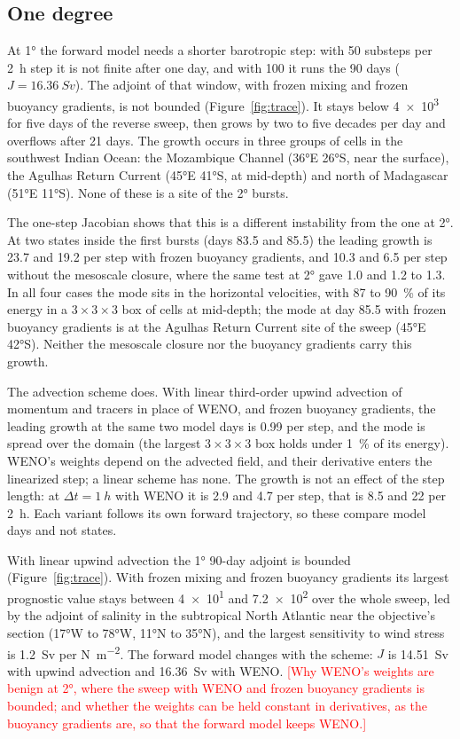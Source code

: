 \documentclass[11pt]{article}
\newcommand{\pending}[1]{\textcolor{red}{[#1]}}
\begin{document}
\subsection{One degree}

At \ang{1} the forward model needs a shorter barotropic step: with 50 substeps per \SI{2}{h} step it is not finite
after one day, and with 100 it runs the 90 days ($J = \SI{16.36}{Sv}$). The adjoint of that window, with frozen
mixing and frozen buoyancy gradients, is not bounded (Figure~\ref{fig:trace}). It stays below \num{4e3} for five
days of the reverse sweep, then grows by two to five decades per day and overflows after 21 days. The growth
occurs in three groups of cells in the southwest Indian Ocean: the Mozambique Channel (\ang{36}E \ang{26}S, near
the surface), the Agulhas Return Current (\ang{45}E \ang{41}S, at mid-depth) and north of Madagascar
(\ang{51}E \ang{11}S). None of these is a site of the \ang{2} bursts.

The one-step Jacobian shows that this is a different instability from the one at \ang{2}. At two states inside the
first bursts (days 83.5 and 85.5) the leading growth is 23.7 and 19.2 per step with frozen buoyancy gradients, and
10.3 and 6.5 per step without the mesoscale closure, where the same test at \ang{2} gave 1.0 and 1.2 to 1.3. In all
four cases the mode sits in the horizontal velocities, with 87 to \SI{90}{\percent} of its energy in a
$3\times3\times3$ box of cells at mid-depth; the mode at day 85.5 with frozen buoyancy gradients is at the Agulhas
Return Current site of the sweep (\ang{45}E \ang{42}S). Neither the mesoscale closure nor the buoyancy gradients
carry this growth.

The advection scheme does. With linear third-order upwind advection of momentum and tracers in place of WENO, and
frozen buoyancy gradients, the leading growth at the same two model days is 0.99 per step, and the mode is spread
over the domain (the largest $3\times3\times3$ box holds under \SI{1}{\percent} of its energy). WENO's weights
depend on the advected field, and their derivative enters the linearized step; a linear scheme has none. The
growth is not an effect of the step length: at $\Delta t = \SI{1}{h}$ with WENO it is 2.9 and 4.7 per step, that
is 8.5 and 22 per \SI{2}{h}. Each variant follows its own forward trajectory, so these compare model days and not
states.

With linear upwind advection the \ang{1} 90-day adjoint is bounded (Figure~\ref{fig:trace}). With frozen mixing and
frozen buoyancy gradients its largest prognostic value stays between \num{4e1} and \num{7.2e2} over the whole
sweep, led by the adjoint of salinity in the subtropical North Atlantic near the objective's section (\ang{17}W to
\ang{78}W, \ang{11}N to \ang{35}N), and the largest sensitivity to wind stress is \SI{1.2}{Sv} per \si{N.m^{-2}}.
The forward model changes with the scheme: $J$ is \SI{14.51}{Sv} with upwind advection and \SI{16.36}{Sv} with WENO.
\pending{Why WENO's weights are benign at \ang{2}, where the sweep with WENO and frozen buoyancy gradients is
bounded; and whether the weights can be held constant in derivatives, as the buoyancy gradients are, so that the
forward model keeps WENO.}
\end{document}
